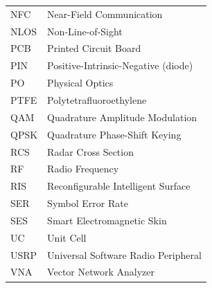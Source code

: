 \begin{tabular}{ l l }
\hspace{1cm} NFC & \hspace{2cm} Near-Field Communication \\
\hspace{1cm} NLOS & \hspace{2cm} Non-Line-of-Sight \\
\hspace{1cm} PCB & \hspace{2cm} Printed Circuit Board \\
\hspace{1cm} PIN & \hspace{2cm} Positive-Intrinsic-Negative (diode) \\
\hspace{1cm} PO & \hspace{2cm} Physical Optics \\
\hspace{1cm} PTFE & \hspace{2cm} Polytetrafluoroethylene \\
\hspace{1cm} QAM & \hspace{2cm} Quadrature Amplitude Modulation \\
\hspace{1cm} QPSK & \hspace{2cm} Quadrature Phase-Shift Keying \\
\hspace{1cm} RCS & \hspace{2cm} Radar Cross Section \\
\hspace{1cm} RF & \hspace{2cm} Radio Frequency \\
\hspace{1cm} RIS & \hspace{2cm} Reconfigurable Intelligent Surface \\
\hspace{1cm} SER & \hspace{2cm} Symbol Error Rate \\
\hspace{1cm} SES & \hspace{2cm} Smart Electromagnetic Skin \\
\hspace{1cm} UC & \hspace{2cm} Unit Cell \\
\hspace{1cm} USRP & \hspace{2cm} Universal Software Radio Peripheral \\
\hspace{1cm} VNA & \hspace{2cm} Vector Network Analyzer \\
\end{tabular}  

\newpage